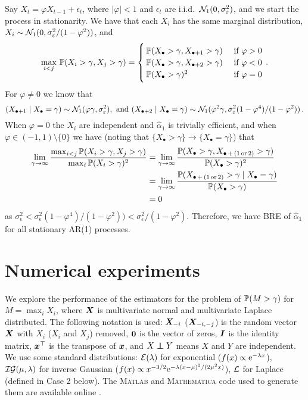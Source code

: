 \begin{Example}[AR(1) processes]
Say $X_t = \varphi X_{t-1} + \epsilon_t$, where $|\varphi| < 1$ and $\epsilon_t$ are i.i.d.\ $\mathcal{N}_1(0, \sigma_{\varepsilon}^2)$, and we start the process in stationarity. We have that each $X_i$ has the same marginal distribution, $X_i \sim \mathcal{N}_1(0, \sigma_{\varepsilon}^2/(1-\varphi^2))$, and
\[
	\max_{i < j} \, \operatorname{{\mathbb P}}(X_i > \gamma, X_j > \gamma) = \begin{cases}
		\operatorname{{\mathbb P}}(X_{\bullet} > \gamma, X_{\bullet+1} > \gamma) & \text{ if } \varphi > 0 \\
		\operatorname{{\mathbb P}}(X_{\bullet} > \gamma, X_{\bullet+2} > \gamma) & \text{ if } \varphi < 0 \\
		\operatorname{{\mathbb P}}(X_{\bullet} > \gamma)^2  & \text{ if } \varphi = 0
	\end{cases} \,.
\]
For $\varphi \not=0$ we know that
\[ (X_{\bullet+1} \mid X_\bullet = \gamma) \sim \mathcal{N}_1(\varphi \gamma, \sigma_{\varepsilon}^2), \text{ and } (X_{\bullet+2} \mid X_{\bullet} = \gamma) \sim \mathcal{N}_1(\varphi^2 \gamma, \sigma_{\varepsilon}^2 (1-\varphi^4) / (1-\varphi^2)) \,. \]
When $\varphi = 0$ the $X_i$ are independent and $\hat{\alpha}_1$ is trivially efficient, and when $\varphi \in (-1, 1) \setminus \{0\}$ we have (noting that $\{X_\bullet > \gamma\} \to \{X_\bullet = \gamma\}$) that
\begin{align*}
	\lim_{\gamma \to \infty} \frac{ \max_{i < j} \operatorname{{\mathbb P}}(X_i > \gamma, X_j > \gamma) }{ \max_{i} \operatorname{{\mathbb P}}(X_i > \gamma)^2 }
	&= \lim_{\gamma \to \infty} \frac{ \operatorname{{\mathbb P}}(X_{\bullet} > \gamma, X_{\bullet\,+\,(1\,\mathrm{or}\,2)} > \gamma) }{ \operatorname{{\mathbb P}}(X_{\bullet} > \gamma)^2 } \\
	&= \lim_{\gamma \to \infty} \frac{ \operatorname{{\mathbb P}}(X_{\bullet\,+\,(1\,\mathrm{or}\,2)} > \gamma \mid X_{\bullet} = \gamma) }{ \operatorname{{\mathbb P}}(X_{\bullet} > \gamma) } \\
	&= 0
\end{align*}
as $\sigma_{\epsilon}^2 < \sigma_{\epsilon}^2 (1-\varphi^4) / (1-\varphi^2)) < \sigma_{\epsilon}^2/(1-\varphi^2)$. Therefore, we have BRE of $\hat{\alpha}_1$ for all stationary AR(1) processes.
\end{Example}

\section{Numerical experiments} \label{scn:numerical_results}

We explore the performance of the estimators for the problem of $\operatorname{{\mathbb P}}(M > \gamma)$ for $M = \max_i X_i$, where $\bm{X}$ is multivariate normal and multivariate Laplace distributed. The following notation is used: $\bm{X}_{-i}$ ($\bm{X}_{-i,-j}$) is the random vector $\bm{X}$ with $X_i$ ($X_i$ and $X_j$) removed, $\bm{0}$ is the vector of zeros, $\bm{I}$ is the identity matrix, $\bm{x}^\top$ is the transpose of $\bm{x}$, and $X \independent Y$ means $X$ and $Y$ are independent. We use some standard distributions: $\mathcal{E}(\lambda)$ for exponential ($f(x)\propto \mathrm{e}^{-\lambda x}$), $\mathcal{IG}(\mu,\lambda)$ for inverse Gaussian ($f(x) \propto x^{-3/2} \mathrm{e}^{-\lambda(x-\mu)^2/(2\mu^2x)}$), $\mathcal{L}$ for Laplace (defined in Case 2 below).
The \textsc{Matlab} and \textsc{Mathematica} code used to generate them are available online \cite{OnlineAccomp}.  

